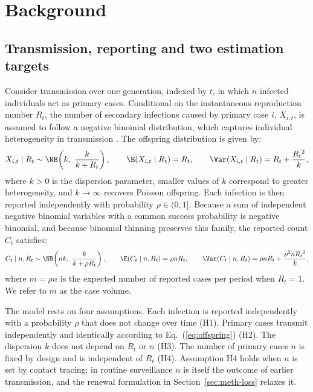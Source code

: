 \section{Background}
\label{sec:background}

\subsection{Transmission, reporting and two estimation targets}
\label{sec:bg-model}

Consider transmission over one generation, indexed by $t$, in which $n$ infected individuals act as primary cases. Conditional on the instantaneous reproduction number $R_t$, the number of secondary infections caused by primary case $i$, $X_{i,t}$, is assumed to follow a negative binomial distribution, which captures individual heterogeneity in transmission \citep{lloydsmith2005superspreading}. The offspring distribution is given by:
\begin{equation}
  X_{i,t}\mid R_t \sim \NB\!\left(k,\ \frac{k}{k+R_t}\right),\qquad
  \E(X_{i,t}\mid R_t)=R_t,\qquad \Var(X_{i,t}\mid R_t)=R_t+\frac{R_t{}^2}{k},
  \label{eq:offspring}
\end{equation}
where $k>0$ is the dispersion parameter, smaller values of $k$ correspond to greater heterogeneity, and $k\to\infty$ recovers Poisson offspring. Each infection is then reported independently with probability $\rho\in(0,1]$. Because a sum of independent negative binomial variables with a common success probability is negative binomial, and because binomial thinning preserves this family, the reported count $C_t$ satisfies:
\begin{equation}
  C_t\mid n,R_t \sim \NB\!\left(nk,\ \frac{k}{k+\rho R_t}\right),\qquad
  \E(C_t\mid n,R_t)=\rho nR_t,\qquad
  \Var(C_t\mid n,R_t)=\rho nR_t+\frac{\rho^2nR_t{}^2}{k},
  \label{eq:observed}
\end{equation}
where $m=\rho n$ is the expected number of reported cases per period when $R_t=1$. We refer to $m$ as the case volume.

The model rests on four assumptions. Each infection is reported independently with a probability $\rho$ that does not change over time (H1). Primary cases transmit independently and identically according to Eq.~(\ref{eq:offspring}) (H2). The dispersion $k$ does not depend on $R_t$ or $n$ (H3). The number of primary cases $n$ is fixed by design and is independent of $R_t$ (H4). Assumption H4 holds when $n$ is set by contact tracing; in routine surveillance $n$ is itself the outcome of earlier transmission, and the renewal formulation in Section~\ref{sec:meth-loss} relaxes it.

